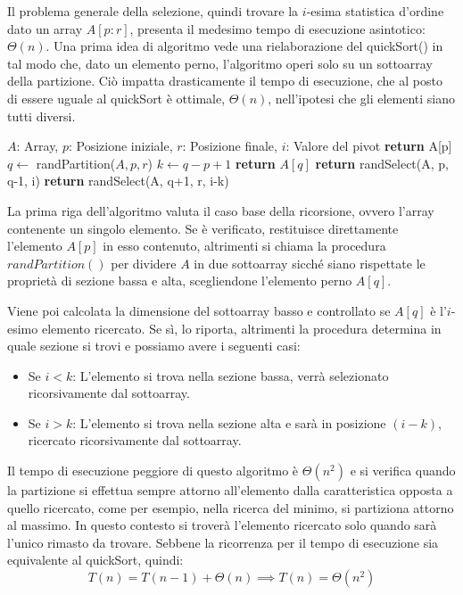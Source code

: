 \noindent Il problema generale della selezione, quindi trovare la $i$-esima statistica d'ordine dato un array $A[p:r]$, presenta il medesimo tempo di
esecuzione asintotico: $\Theta(n)$. Una prima idea di algoritmo vede una rielaborazione del quickSort() in tal modo che, dato un elemento perno,
l'algoritmo operi solo su un sottoarray della partizione. Ciò impatta drasticamente il tempo di esecuzione, che al posto di essere uguale al quickSort
è ottimale, $\Theta(n)$, nell'ipotesi che gli elementi siano tutti diversi.
\begin{algorithm}[h]
	\caption{randSelect(A, p, r, i)}
	\begin{algorithmic}[i]
		\Require $A$: Array, $p$: Posizione iniziale, $r$: Posizione finale, $i$: Valore del pivot
		 \textbf{return} A[p]
		\EndIf
		\State $q\gets$ randPartition($A, p, r$) 
		\State $k\gets q-p+1$ 
		 \textbf{return} $A[q]$ 
		 \textbf{return} randSelect(A, p, q-1, i) 
		\Else \textbf{ return} randSelect(A, q+1, r, i-k) 
		\EndIf
	\end{algorithmic}
\end{algorithm}

\noindent La prima riga dell'algoritmo valuta il caso base della ricorsione, ovvero l'array contenente un singolo elemento. Se è verificato,
restituisce direttamente l'elemento $A[p]$ in esso contenuto, altrimenti si chiama la procedura $randPartition()$ per dividere $A$ in due sottoarray
sicché siano rispettate le proprietà di sezione bassa e alta, scegliendone l'elemento perno $A[q]$.\par
Viene poi calcolata la dimensione del sottoarray basso e controllato se $A[q]$ è l'$i$-esimo elemento ricercato. Se sì, lo riporta, altrimenti la
procedura determina in quale sezione si trovi e possiamo avere i seguenti casi: \begin{itemize} 
	\item Se $i < k$: L'elemento si trova nella sezione bassa, verrà selezionato ricorsivamente dal sottoarray.
	\item Se $i > k$: L'elemento si trova nella sezione alta e sarà in posizione $(i-k)$, ricercato ricorsivamente dal sottoarray.
\end{itemize}

\noindent Il tempo di esecuzione peggiore di questo algoritmo è $\Theta(n^2)$ e si verifica quando la partizione si effettua sempre attorno all'elemento
dalla caratteristica opposta a quello ricercato, come per esempio, nella ricerca del minimo, si partiziona attorno al massimo. In questo contesto si
troverà l'elemento ricercato solo quando sarà l'unico rimasto da trovare. Sebbene la ricorrenza per il tempo di esecuzione sia equivalente al quickSort,
quindi: \[
	T(n) = T(n-1)+\Theta(n) \implies T(n) = \Theta(n^2)
\]

